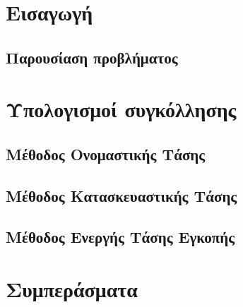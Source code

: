 \documentclass{article}
\begin{document}



\tableofcontents

\section{Εισαγωγή}
\subsection{Παρουσίαση προβλήματος}

\section{Υπολογισμοί συγκόλλησης}
\subsection{Μέθοδος Ονομαστικής Τάσης}

\subsection{Μέθοδος Κατασκευαστικής Τάσης}

\subsection{Μέθοδος Ενεργής Τάσης Εγκοπής}


\section{Συμπεράσματα}

\listoffigures
\listoftables
\end{document}

